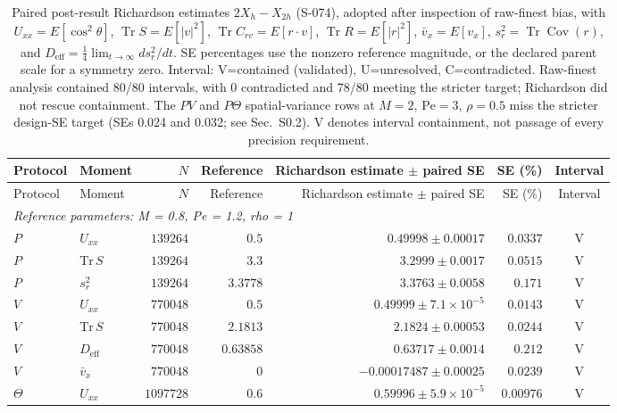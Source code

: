\begingroup
\small
\setlength{\tabcolsep}{3pt}
\begin{longtable}{llrrrrc}
\caption{Paired post-result Richardson estimates $2X_h-X_{2h}$ (S-074), adopted after inspection of raw-finest bias, with $U_{xx}=E[\cos^2\theta]$, $\operatorname{Tr}S=E[|v|^2]$, $\operatorname{Tr}C_{rv}=E[r\cdot v]$, $\operatorname{Tr}R=E[|r|^2]$, $\bar v_x=E[v_x]$, $s_r^2=\operatorname{Tr}\operatorname{Cov}(r)$, and $D_{\mathrm{eff}}=\tfrac14\lim_{t\to\infty}d s_r^2/dt$. SE percentages use the nonzero reference magnitude, or the declared parent scale for a symmetry zero. Interval: V=contained (validated), U=unresolved, C=contradicted. Raw-finest analysis contained 80/80 intervals, with 0 contradicted and 78/80 meeting the stricter target; Richardson did not rescue containment. The $PV$ and $P\Theta$ spatial-variance rows at $M=2$, $\mathrm{Pe}=3$, $\rho=0.5$ miss the stricter design-SE target (SEs 0.024 and 0.032; see Sec.~S0.2). V denotes interval containment, not passage of every precision requirement.}\label{tab:s074}\\
\hline
Protocol & Moment & $N$ & Reference & Richardson estimate $\pm$ paired SE & SE (\%) & Interval \\
\hline
\endfirsthead
\hline
Protocol & Moment & $N$ & Reference & Richardson estimate $\pm$ paired SE & SE (\%) & Interval \\
\hline
\endhead
\multicolumn{7}{l}{\textit{Reference parameters: M = 0.8, Pe = 1.2, rho = 1}} \\*
$P$ & $U_{xx}$ & $139264$ & $0.5$ & $0.49998 \pm 0.00017$ & $0.0337$ & V \\
$P$ & $\mathrm{Tr}\,S$ & $139264$ & $3.3$ & $3.2999 \pm 0.0017$ & $0.0515$ & V \\
$P$ & $s_r^2$ & $139264$ & $3.3778$ & $3.3763 \pm 0.0058$ & $0.171$ & V \\
$V$ & $U_{xx}$ & $770048$ & $0.5$ & $0.49999 \pm 7.1\times10^{-5}$ & $0.0143$ & V \\
$V$ & $\mathrm{Tr}\,S$ & $770048$ & $2.1813$ & $2.1824 \pm 0.00053$ & $0.0244$ & V \\
$V$ & $D_{\mathrm{eff}}$ & $770048$ & $0.63858$ & $0.63717 \pm 0.0014$ & $0.212$ & V \\
$V$ & $\bar v_x$ & $770048$ & $0$ & $-0.00017487 \pm 0.00025$ & $0.0239$ & V \\
$\Theta$ & $U_{xx}$ & $1097728$ & $0.6$ & $0.59996 \pm 5.9\times10^{-5}$ & $0.00976$ & V \\

\end{longtable}
